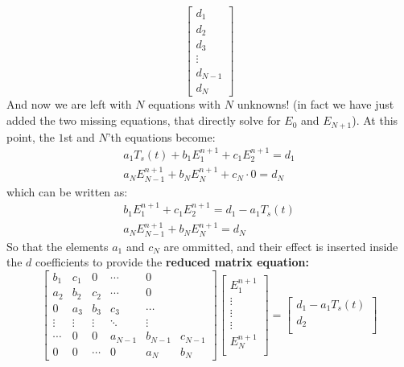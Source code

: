 \documentclass[11pt]{article}
\begin{document}
\begin{enumerate}
\begin{enumerate}
\begin{equation}
\begin{bmatrix}
    d_1 \\
    d_2 \\
    d_3 \\
    \vdots \\
    d_{N-1} \\
    d_{N}
    \end{bmatrix}
    \end{equation}
    And now we are left with $N$ equations with $N$ unknowns! (in fact we have just added the two missing equations, that directly solve for $E_0$ and $E_{N+1}$). \newline \newline
    At this point, the $1$st and $N$'th equations become:
    \begin{gather}
      a_1 T_s(t) + b_1 E_1^{n+1} + c_1 E_2^{n+1} = d_1 \\
      a_N E_{N-1}^{n+1} + b_N E_N^{n+1} + c_N \cdot 0= d_N
    \end{gather}
    which can be written as:
    \begin{gather}
      b_1 E_1^{n+1} + c_1 E_2^{n+1} = d_1 - a_1 T_s(t)\\
      a_N E_{N-1}^{n+1} + b_N E_N^{n+1} = d_N
    \end{gather}
    So that the elements $a_1$ and $c_N$ are ommitted, and their effect is inserted inside the $d$ coefficients to provide the \textbf{reduced matrix equation:}
    \begin{equation}
    \begin{bmatrix}
    b_1 & c_1 & 0 & \cdots & 0 \\
    a_2 & b_2 & c_2 & \cdots & 0  \\  
    0 & a_3 & b_3 & c_3 &\cdots  \\
    \vdots & \vdots & \vdots & \ddots & \vdots  \\
    \cdots & 0 & 0 & a_{N-1} & b_{N-1} & c_{N-1} \\
    0 & 0 & \cdots & 0 & a_{N} & b_{N}
    \end{bmatrix}
    \begin{bmatrix}
    E_1^{n+1} \\
    \vdots \\
    \vdots \\
    \vdots \\
    E_{N}^{n+1} \\
    \end{bmatrix}
    =
    \begin{bmatrix}
    d_1 - a_1 T_s(t) \\
    d_2 \\

\end{bmatrix}
\end{equation}
\end{enumerate}
\end{enumerate}
\end{document}
